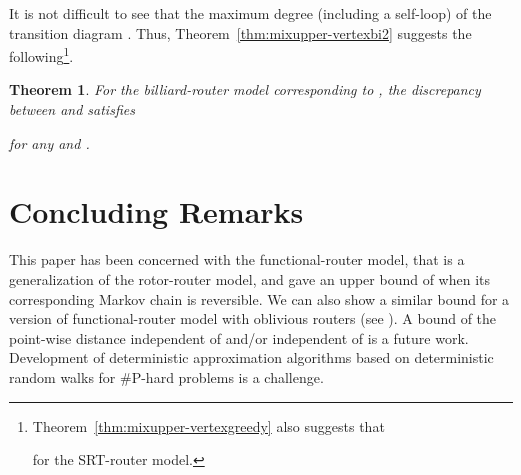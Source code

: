 \documentclass[letter, 11pt]{article}
\newcommand{\1}{\mbox{1}\hspace{-0.25em}\mbox{l}}
\newtheorem{theorem}{Theorem}[section]
\begin{document}
 It is not difficult to see that the maximum degree  (including a self-loop) 
   of the transition diagram . 
 Thus, Theorem~\ref{thm:mixupper-vertexbi2} suggests the following\footnote{
   Theorem~\ref{thm:mixupper-vertexgreedy} also suggests that 
 
for the SRT-router model.  }. 
\begin{theorem}\label{thm:matchingupper}
For the billiard-router model corresponding to , 
 the discrepancy between  and  satisfies

for any  and . 
\end{theorem}



\section{Concluding Remarks}
 This paper has been concerned with the functional-router model, 
   that is a generalization of the rotor-router model, and 
   gave an upper bound of  
   when its corresponding Markov chain is reversible. 
 We can also show a similar bound 
  for a version of functional-router model 
  with oblivious routers (see \cite{shiraga}). 
A bound of the point-wise distance 
   independent of  and/or independent of  
  is a future work. 
Development of deterministic approximation algorithms 
  based on deterministic random walks for {\#}P-hard problems is a challenge. 
\end{document}
